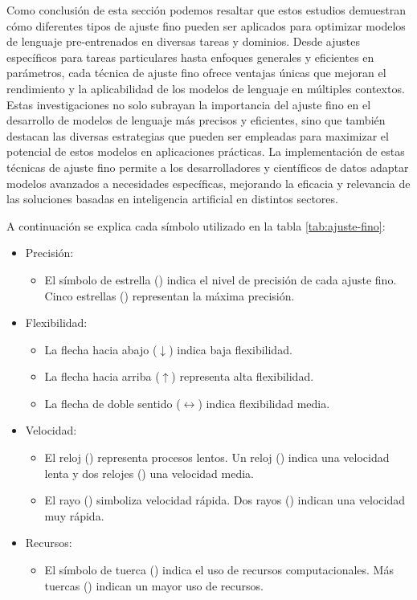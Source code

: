 Como conclusión de esta sección podemos resaltar que estos estudios demuestran cómo diferentes tipos de ajuste fino pueden ser aplicados para optimizar modelos de lenguaje pre-entrenados en diversas tareas y dominios. Desde ajustes específicos para tareas particulares hasta enfoques generales y eficientes en parámetros, cada técnica de ajuste fino ofrece ventajas únicas que mejoran el rendimiento y la aplicabilidad de los modelos de lenguaje en múltiples contextos. Estas investigaciones no solo subrayan la importancia del ajuste fino en el desarrollo de modelos de lenguaje más precisos y eficientes, sino que también destacan las diversas estrategias que pueden ser empleadas para maximizar el potencial de estos modelos en aplicaciones prácticas. La implementación de estas técnicas de ajuste fino permite a los desarrolladores y científicos de datos adaptar modelos avanzados a necesidades específicas, mejorando la eficacia y relevancia de las soluciones basadas en inteligencia artificial en distintos sectores.

A continuación se explica cada símbolo utilizado en la tabla \ref{tab:ajuste-fino}:

\begin{itemize}
	\item Precisión: 
	\begin{itemize}
		\item El símbolo de estrella (\starL) indica el nivel de precisión de cada ajuste fino. Cinco estrellas (\starL\starL\starL\starL\starL) representan la máxima precisión.
	\end{itemize}
	\item Flexibilidad:
	\begin{itemize}
		\item La flecha hacia abajo ($\downarrow$) indica baja flexibilidad.
		\item La flecha hacia arriba ($\uparrow$) representa alta flexibilidad.
		\item La flecha de doble sentido ($\leftrightarrow$) indica flexibilidad media.
	\end{itemize}
	\item Velocidad:
	\begin{itemize}
		\item El reloj (\reloj) representa procesos lentos. Un reloj (\reloj) indica una velocidad lenta y dos relojes (\reloj\reloj) una velocidad media.
		\item El rayo (\rayo) simboliza velocidad rápida. Dos rayos (\rayo\rayo) indican una velocidad muy rápida.
	\end{itemize}
	\item Recursos:
	\begin{itemize}
		\item El símbolo de tuerca (\monitor) indica el uso de recursos computacionales. Más tuercas (\monitor\monitor\monitor\monitor) indican un mayor uso de recursos.
	\end{itemize}
\end{itemize}

